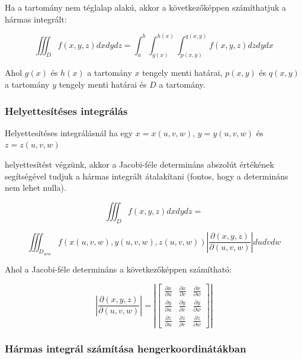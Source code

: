 \documentclass{article}
\begin{document}
Ha a tartomány nem téglalap alakú, akkor a következőképpen számíthatjuk a hármas integrált:

\begin{equation*}
    \iiint_{D} f(x,y,z) dx dy dz = \int_{a}^{b} \int_{g(x)}^{h(x)} \int_{p(x,y)}^{q(x,y)} f(x,y,z) dz dy dx
\end{equation*}

Ahol $g(x)$ és $h(x)$ a tartomány $x$ tengely menti határai, $p(x,y)$ és $q(x,y)$ a tartomány $y$ tengely menti határai és $D$ a tartomány.

\subsubsection{Helyettesítéses integrálás}

Helyettesítéses integrálásnál ha egy $x=x(u,v,w)$, $y=y(u,v,w)$ és $z=z(u,v,w)$

helyettesítést végzünk, akkor a Jacobi-féle determináns abszolút értékének segítségével tudjuk a hármas integrált átalakítani
 (fontos, hogy a determináns nem lehet nulla).

\begin{equation*}
    \iiint_{D} f(x,y,z) dx dy dz =
\end{equation*}


\begin{equation*}
    \iiint_{D_{uvw}} f(x(u,v,w), y(u,v,w), z(u,v,w)) \left| \frac{\partial(x,y,z)}{\partial(u,v,w)} \right| du dv dw
\end{equation*}

Ahol a Jacobi-féle determináns a következőképpen számítható:

\begin{equation*}
    \left| \frac{\partial(x,y,z)}{\partial(u,v,w)} \right| = \left| \begin{bmatrix} \frac{\partial x}{\partial u} & \frac{\partial x}{\partial v} & \frac{\partial x}{\partial w} \\ \frac{\partial y}{\partial u} & \frac{\partial y}{\partial v} & \frac{\partial y}{\partial w} \\ \frac{\partial z}{\partial u} & \frac{\partial z}{\partial v} & \frac{\partial z}{\partial w} \end{bmatrix} \right|
\end{equation*}

\newpage

\subsubsection{Hármas integrál számítása hengerkoordinátákban}
\end{document}
